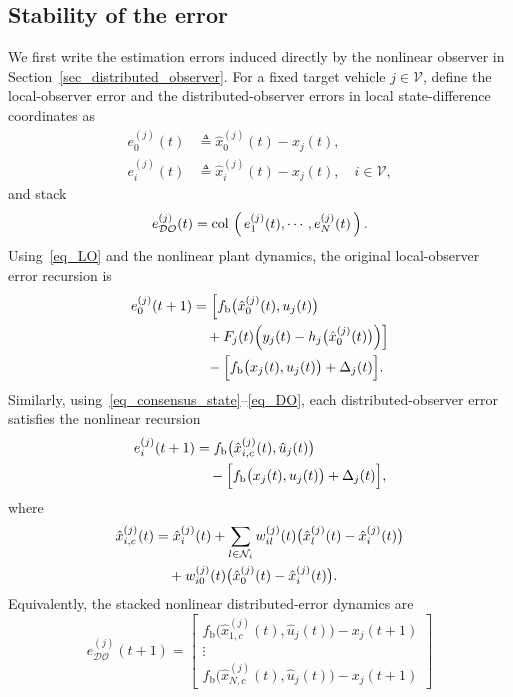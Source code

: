 \documentclass[journal,twoside]{IEEEtran}
\def\col#1{\mathop{{\rm col}\,\left(\,#1\,\right)}}
\def\V{\mathcal{V}} %
\def\N{\mathcal{N}} %
\def\DO{\mathcal{DO}} %
\begin{document}
\subsection{Stability of the error}\label{subsec_Prove}
We first write the estimation errors induced directly by the nonlinear observer in Section~\ref{sec_distributed_observer}. For a fixed target vehicle $j\in\V$, define the local-observer error and the distributed-observer errors in local state-difference coordinates as
\begin{equation}\label{eq:def_nonlinear_errors}
\begin{aligned}
e_0^{(j)}(t)&\triangleq \hat{x}_0^{(j)}(t)-x_j(t),\\
e_i^{(j)}(t)&\triangleq \hat{x}_i^{(j)}(t)-x_j(t),\quad i\in\V,
\end{aligned}
\end{equation}
and stack
\begin{equation}\label{eq:def_eDO}
e_{\DO}^{(j)}(t)=\col{e_1^{(j)}(t),\cdots,e_N^{(j)}(t)} .
\end{equation}
Using~\eqref{eq_LO} and the nonlinear plant dynamics, the original local-observer error recursion is
\begin{align}
e_0^{(j)}(t+1)
&=\Big[
f_{\mathrm{b}}\big(\hat{x}_0^{(j)}(t),u_j(t)\big)
 \notag\\
&\quad+F_j(t)\Big(y_j(t)-h_j\big(\hat{x}_0^{(j)}(t)\big)\Big)
\Big]\notag\\
&\quad -
\Big[
f_{\mathrm{b}}\big(x_j(t),u_j(t)\big)+\Delta_j(t)
\Big].
\label{eq_raw_e0}
\end{align}
Similarly, using~\eqref{eq_consensus_state}--\eqref{eq_DO}, each distributed-observer error satisfies the nonlinear recursion
\begin{align}
e_i^{(j)}(t+1)
&=f_{\mathrm{b}}\big(\hat{x}_{i,c}^{(j)}(t),\hat{u}_j(t)\big)\notag\\
&\quad -
\Big[
f_{\mathrm{b}}\big(x_j(t),u_j(t)\big)+\Delta_j(t)
\Big],
\label{eq_raw_ei}
\end{align}
where
\begin{align}
\hat{x}_{i,c}^{(j)}(t)
&= \hat{x}_i^{(j)}(t)
+\sum_{l \in \N_i} w_{il}^{(j)}(t)
   \big(\hat{x}_l^{(j)}(t)-\hat{x}_i^{(j)}(t)\big)\notag\\
&\quad + w_{i0}^{(j)}(t)
   \big(\hat{x}_0^{(j)}(t)-\hat{x}_i^{(j)}(t)\big).
\label{eq_raw_consensus_state}
\end{align}
Equivalently, the stacked nonlinear distributed-error dynamics are
\begin{equation}\label{eq_raw_eDO}
e_{\DO}^{(j)}(t+1)
=
\begin{bmatrix}
    f_{\mathrm{b}}\big(\hat{x}_{1,c}^{(j)}(t),\hat{u}_j(t)\big)-x_j(t+1) \\
    \vdots \\
    f_{\mathrm{b}}\big(\hat{x}_{N,c}^{(j)}(t),\hat{u}_j(t)\big)-x_j(t+1)
    \end{bmatrix}
\end{equation}
\end{document}
